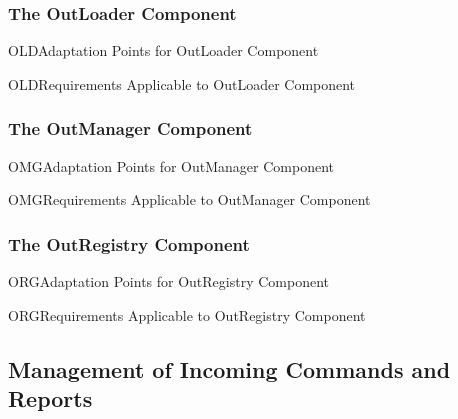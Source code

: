\documentclass[a4paper,10pt]{article}
\newenvironment{cr_req}[2]
{%
\begin{longtable}{|l|p{9.8cm}|}
\caption{#2} \\
\hline
\rowcolor{light-gray}
\textbf{Req. ID} & \textbf{Requirement Text}\\
\hline\hline
\endfirsthead
\rowcolor{light-gray}
\textbf{Req. ID} & \textbf{Requirement Text}\\
\hline\hline
\endhead
\DTLforeach*[\DTLiseq{\cat}{#1}]{dbReq}{\cat=Category,\type=Type,\id=Id,\reqText=Text}
{\DTLiffirstrow{}{\\\hline}\cat-\id/\type & \textit{\reqText}}\\\hline
}
{\end{longtable}}
\newenvironment{cr_ap}[2]
{%
\begin{longtable}{|l|p{4.7cm}|p{4.9cm}|}
\caption{#2} \\
\hline
\rowcolor{light-gray}
\textbf{AP ID} & \textbf{Adaptation Point} & \textbf{Default Value}\\
\hline\hline
\endfirsthead
\rowcolor{light-gray}
\textbf{AP ID} & \textbf{Adaptation Point} & \textbf{Default Value}\\
\hline\hline
\endhead
\DTLforeach*[\DTLiseq{\cat}{#1}]{dbAP}{\cat=Category,\id=Id,\ap=AP,\defValue=DefValue}
{\DTLiffirstrow{}{\\\hline}\cat-\id & \ap & \defValue}\\\hline
}
{\end{longtable}}
\begin{document}
\subsubsection{The OutLoader Component}\label{sec:OutLoader}


\begin{cr_ap}{OLD}{Adaptation Points for OutLoader Component}
\end{cr_ap}

\begin{cr_req}{OLD}{Requirements Applicable to OutLoader Component}
\end{cr_req}

\newpage
\subsubsection{The OutManager Component}\label{sec:OutManager}


\begin{cr_ap}{OMG}{Adaptation Points for OutManager Component}
\end{cr_ap}

\begin{cr_req}{OMG}{Requirements Applicable to OutManager Component}
\end{cr_req}

\subsubsection{The OutRegistry Component}\label{sec:OutRegistry}


\begin{cr_ap}{ORG}{Adaptation Points for OutRegistry Component}
\end{cr_ap}

\begin{cr_req}{ORG}{Requirements Applicable to OutRegistry Component}
\end{cr_req}

\subsection{Management of Incoming Commands and Reports}\label{sec:ManagementOfIncomingCmdAndRep}

\end{document}
